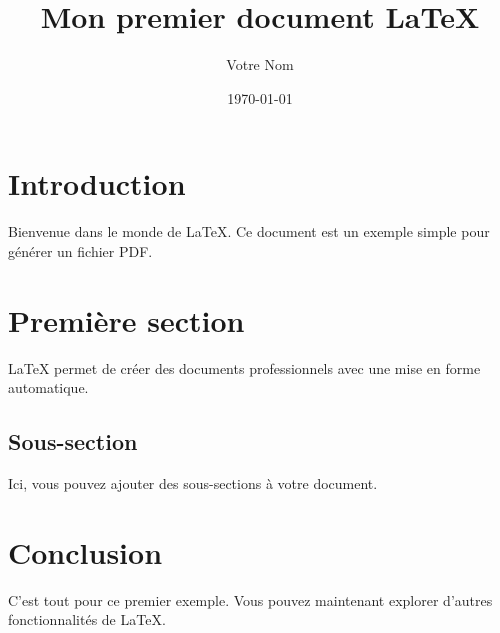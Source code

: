 \documentclass{article}
\title{Mon premier document LaTeX}
\author{Votre Nom}
\date{\today}
\begin{document}
\maketitle

\section{Introduction}
Bienvenue dans le monde de \LaTeX. Ce document est un exemple simple pour générer un fichier PDF.

\section{Première section}
LaTeX permet de créer des documents professionnels avec une mise en forme automatique.

\subsection{Sous-section}
Ici, vous pouvez ajouter des sous-sections à votre document.

\section{Conclusion}
C'est tout pour ce premier exemple. Vous pouvez maintenant explorer d'autres fonctionnalités de LaTeX.
\end{document}
